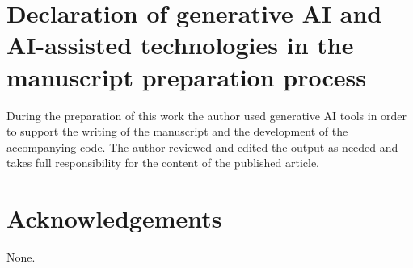 \documentclass[preprint,times]{elsarticle}
\begin{document}
\section*{Declaration of generative AI and AI-assisted technologies in the manuscript
preparation process}
During the preparation of this work the author used generative AI tools in order to
support the writing of the manuscript and the development of the accompanying code. The
author reviewed and edited the output as needed and takes full responsibility for the
content of the published article.

\section*{Acknowledgements}
None.
\end{document}
